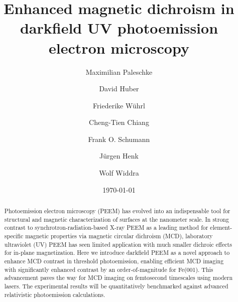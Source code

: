 \documentclass[prl,twocolumn,floatfix,superscriptaddress,aps]{revtex4-2}
\begin{document}
\title{Enhanced magnetic dichroism in darkfield UV photoemission electron microscopy}
\author{Maximilian Paleschke}
\author{David Huber}
\author{Friederike W\"{u}hrl}

\author{Cheng-Tien Chiang}

\author{Frank O. Schumann}

\author{J\"{u}rgen Henk}
\author{Wolf Widdra}


\date{\today}

\begin{abstract}
    Photoemission electron microscopy (PEEM) has evolved into an indispensable tool for structural and magnetic characterization of surfaces at the nanometer scale. In strong contrast to synchrotron-radiation-based X-ray PEEM as a leading method for element-specific magnetic properties via magnetic circular dichroism (MCD), laboratory ultraviolet (UV) PEEM has seen limited application with much smaller dichroic effects for in-plane magnetization. Here we introduce darkfield PEEM as a novel approach to enhance MCD contrast in threshold photoemission, enabling efficient MCD imaging with significantly enhanced contrast by an order-of-magnitude for Fe(001). This advancement paves the way for
    MCD imaging on femtosecond timescales using modern lasers. The experimental results will be quantitatively benchmarked against advanced relativistic photoemission calculations.
\end{abstract}

\pacs{}
\end{document}
